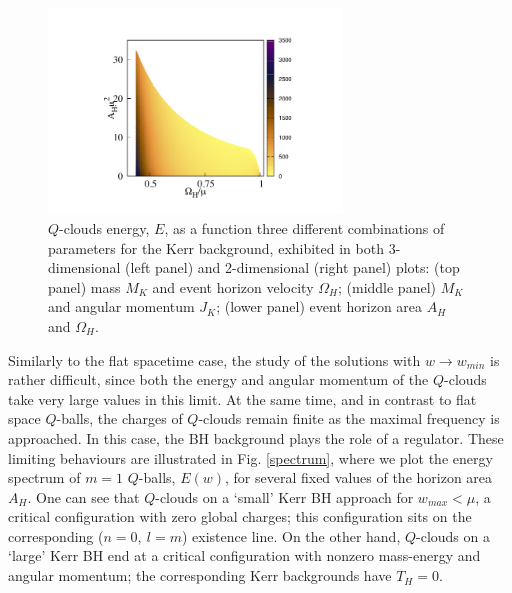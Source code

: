 \begin{figure}[h!]
\includegraphics[height=2.15in]{papers/QClouds/EAHw-2D.jpeg}
\caption{$Q$-clouds energy, $E$, as a function three different combinations of parameters for the Kerr background, exhibited in both 3-dimensional (left panel) and 2-dimensional (right panel) plots: (top panel) mass $M_K$ and event horizon velocity $\Omega_H$; (middle panel) $M_K$ and angular momentum $J_K$; (lower panel) event horizon area $A_H$ and  $\Omega_H$.   
} 
\label{energy1}
\end{figure}




\newpage

Similarly to the flat spacetime case,
  the study of the solutions with $w\to w_{min}$
  is rather difficult, since
 both the energy and angular momentum of the $Q$-clouds 
 take very large values in this limit. 
 At the same time, and in contrast to flat space $Q$-balls, the charges of $Q$-clouds
 remain finite as the maximal frequency is approached. In this case, the BH background plays the role of a regulator.
 These limiting behaviours are illustrated in Fig. \ref{spectrum}, where we plot the energy spectrum of $m=1$ $Q$-balls,
 $E(w)$,
 for several fixed values of the horizon area $A_H$.
 One can see that $Q$-clouds on a `small'  Kerr BH
 approach  for $w_{max}<\mu$,
 a critical configuration with zero global charges; this configuration sits 
 on the corresponding ($n=0,~l=m$)  existence line.
On the other hand, $Q$-clouds on a `large' Kerr BH 
 end at a critical configuration with nonzero mass-energy and angular momentum;
 the corresponding Kerr backgrounds have $T_H=0$. 







 
 
